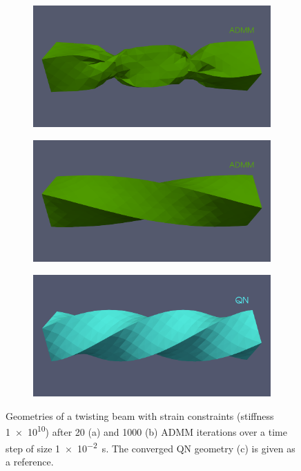 \begin{figure}
    \begin{subfigure}{0.49\textwidth}
    \includegraphics[width=\textwidth, trim={0 5.0cm 0 2.5cm}, clip]{figures/twisted_beam_bad_state_admm.png}
    \end{subfigure}
    \begin{subfigure}{0.49\textwidth}
    \includegraphics[width=\textwidth, trim={0 5.0cm 0 2.5cm}, clip]{figures/twisted_beam_artificial_state_admm.png}
    \end{subfigure}
    \centering
    \par\medskip
    \begin{subfigure}{0.49\textwidth}
    \includegraphics[width=\textwidth, trim={0 5.0cm 0 2.5cm}, clip]{figures/twisted_beam_qn.png}
    \end{subfigure}
    \caption{Geometries of a twisting beam with strain constraints (stiffness \num{1e10}) after 20 (a) and 1000 (b) ADMM iterations over a time step of size 
        \SI{1e-2}{\second}. The converged QN geometry (c) is given as a reference.}
    \label{fig:strain-beam-twist-admm-geometries}
\end{figure}

